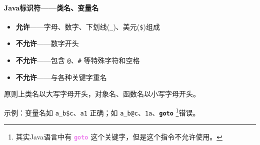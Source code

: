 \documentclass[UTF8]{ctexart}
\newcommand\keyword[1]{\textcolor{violet}{\textbf{\texttt{#1}}}}
\begin{document}
\newpage
{}
\BgThispage
\paragraph{Java标识符——类名、变量名}

\begin{itemize}[itemsep=0pt,parsep=0pt]
  \item \textbf{允许}——字母、数字、下划线(\verb!_!)、美元(\verb!$!)组成
  \item \textbf{不允许}——数字开头
  \item \textbf{不允许}——包含 \verb!@!、\verb!#! 等特殊字符和空格
  \item \textbf{不允许}——与各种关键字重名
\end{itemize}

原则上类名以大写字母开头，对象名、函数名以小写字母开头。

示例：变量名如 \verb!a_b$c!、\verb!a1! 正确；如 \verb!a_b@c!、\verb!1a!、\textbf{\texttt{goto}} \footnote{其实Java语言中有 \keyword{goto} 这个关键字，但是这个指令不允许使用。}错误。
\end{document}
